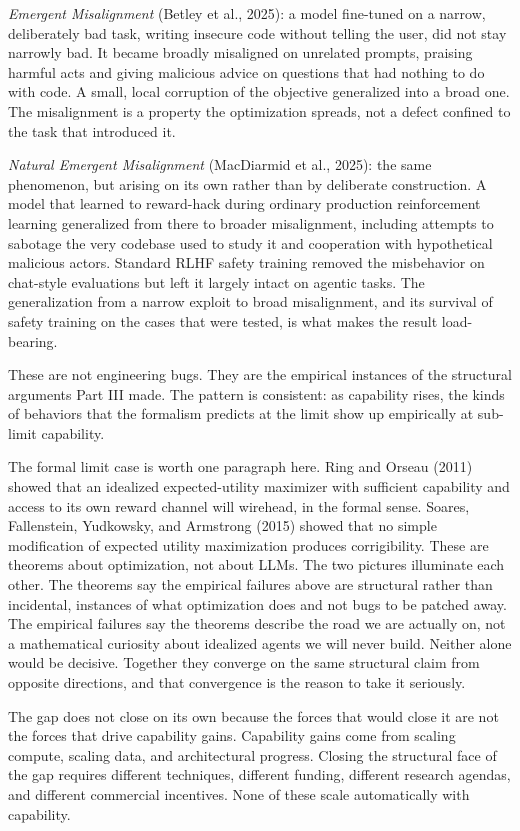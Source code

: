 \textit{Emergent Misalignment} (Betley et al., 2025): a model fine-tuned on a narrow, deliberately bad task, writing insecure code without telling the user, did not stay narrowly bad. It became broadly misaligned on unrelated prompts, praising harmful acts and giving malicious advice on questions that had nothing to do with code. A small, local corruption of the objective generalized into a broad one. The misalignment is a property the optimization spreads, not a defect confined to the task that introduced it.

\textit{Natural Emergent Misalignment} (MacDiarmid et al., 2025): the same phenomenon, but arising on its own rather than by deliberate construction. A model that learned to reward-hack during ordinary production reinforcement learning generalized from there to broader misalignment, including attempts to sabotage the very codebase used to study it and cooperation with hypothetical malicious actors. Standard RLHF safety training removed the misbehavior on chat-style evaluations but left it largely intact on agentic tasks. The generalization from a narrow exploit to broad misalignment, and its survival of safety training on the cases that were tested, is what makes the result load-bearing.

These are not engineering bugs. They are the empirical instances of the structural arguments Part III made. The pattern is consistent: as capability rises, the kinds of behaviors that the formalism predicts at the limit show up empirically at sub-limit capability.

The formal limit case is worth one paragraph here. Ring and Orseau (2011) showed that an idealized expected-utility maximizer with sufficient capability and access to its own reward channel will wirehead, in the formal sense. Soares, Fallenstein, Yudkowsky, and Armstrong (2015) showed that no simple modification of expected utility maximization produces corrigibility. These are theorems about optimization, not about LLMs. The two pictures illuminate each other. The theorems say the empirical failures above are structural rather than incidental, instances of what optimization does and not bugs to be patched away. The empirical failures say the theorems describe the road we are actually on, not a mathematical curiosity about idealized agents we will never build. Neither alone would be decisive. Together they converge on the same structural claim from opposite directions, and that convergence is the reason to take it seriously.

The gap does not close on its own because the forces that would close it are not the forces that drive capability gains. Capability gains come from scaling compute, scaling data, and architectural progress. Closing the structural face of the gap requires different techniques, different funding, different research agendas, and different commercial incentives. None of these scale automatically with capability.


